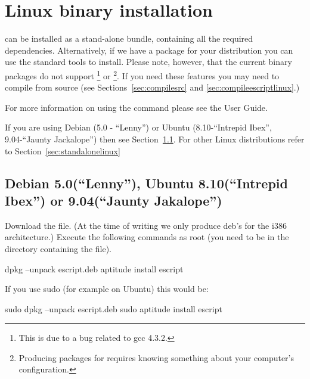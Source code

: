 
%
%
%

\section{Linux binary installation}
\label{sec:binlinux}

\esfinley can be installed as a stand-alone bundle, containing all the required dependencies.
Alternatively, if we have a package for your distribution you can use the standard tools to install.
Please note, however, that the current binary packages do not support \openmp\footnote{This is due to a bug related to gcc 4.3.2.} or \mpi\footnote{Producing packages for \mpi requires knowing something about your computer's configuration.}.
If you need these features you may need to compile \esfinley from source (see Sections~\ref{sec:compilesrc} and \ref{sec:compileescriptlinux}.)

For more information on using the  command please see the User Guide.

If you are using Debian (5.0 - ``Lenny'') or Ubuntu (8.10-``Intrepid Ibex'', 9.04-``Jaunty Jackalope'') then see Section~\ref{sec:debian}.
For other Linux distributions refer to Section~\ref{sec:standalonelinux} 

\subsection{Debian 5.0(``Lenny''), Ubuntu 8.10(``Intrepid Ibex'') or 9.04(``Jaunty Jakalope'')}\label{sec:debian}

Download the  file.
(At the time of writing we only produce deb's for the i386 architecture.)
Execute the following commands as root (you need to be in the directory containing the file).
\begin{shellCode}
 dpkg --unpack escript.deb
 aptitude install escript
\end{shellCode}

If you use sudo (for example on Ubuntu) this would be:
\begin{shellCode}
sudo dpkg --unpack escript.deb
sudo aptitude install escript
\end{shellCode}

